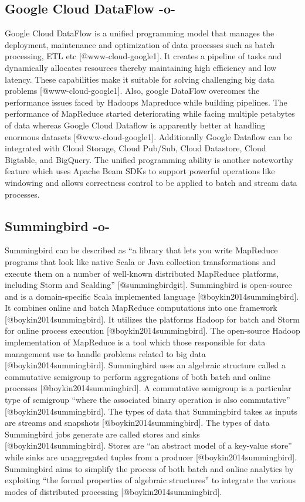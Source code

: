 \subsection{Google Cloud DataFlow -o-}
     
Google Cloud DataFlow is a unified programming model that manages the
deployment, maintenance and optimization of data processes such as
batch processing, ETL etc [@www-cloud-google1]. It creates a
pipeline of tasks and dynamically allocates resources thereby
maintaining high efficiency and low latency. These capabilities make
it suitable for solving challenging big data problems
[@www-cloud-google1]. Also, google DataFlow overcomes the
performance issues faced by Hadoops Mapreduce while building
pipelines\cite{www-dataconomy}.  The performance of MapReduce started
deteriorating while facing multiple petabytes of data whereas Google
Cloud Dataflow is apparently better at handling enormous datasets
[@www-cloud-google1]. Additionally Google Dataflow can be
integrated with Cloud Storage, Cloud Pub/Sub, Cloud Datastore, Cloud
Bigtable, and BigQuery. The unified programming ability is another
noteworthy feature which uses Apache Beam SDKs to support powerful
operations like windowing and allows correctness control to be applied
to batch and stream data processes.



     
\subsection{Summingbird -o-}
     
Summingbird can be described as ``a library that lets you write
MapReduce programs that look like native Scala or Java collection
transformations and execute them on a number of well-known distributed
MapReduce platforms, including Storm and
Scalding'' [@summingbirdgit]. Summingbird is open-source and is a
domain-specific Scala implemented
language [@boykin2014summingbird]. It combines online and batch
MapReduce computations into one
framework [@boykin2014summingbird]. It utilizes the platforms
Hadoop for batch and Storm for online process
execution [@boykin2014summingbird]. The open-source Hadoop
implementation of MapReduce is a tool which those responsible for data
management use to handle problems related to big
data [@boykin2014summingbird]. Summingbird uses an algebraic
structure called a commutative semigroup to perform aggregations of
both batch and online processes [@boykin2014summingbird]. A
commutative semigroup is a particular type of semigroup ``where the
associated binary operation is also
commutative'' [@boykin2014summingbird].  The types of data that
Summingbird takes as inputs are streams and
snapshots [@boykin2014summingbird]. The types of data Summingbird
jobs generate are called stores and
sinks [@boykin2014summingbird]. Stores are ``an abstract model of
a key-value store'' while sinks are unaggregated tuples from a
producer [@boykin2014summingbird]. Summingbird aims to simplify
the process of both batch and online analytics by exploiting ``the
formal properties of algebraic structures'' to integrate the various
modes of distributed processing [@boykin2014summingbird].


